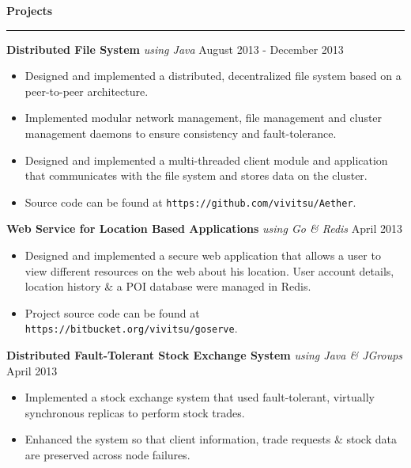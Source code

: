 \documentclass[10pt]{article}
\begin{document}
\textbf{Projects}
\smallskip
\hrule
\textbf{Distributed File System} \textit{using Java} \hfill August 2013 - December 2013
\begin{itemize}
    \item Designed and implemented a distributed, decentralized file system based on a peer-to-peer architecture.
    \item Implemented modular network management, file management and cluster management daemons to ensure consistency and fault-tolerance.
    \item Designed and implemented a multi-threaded client module and application that communicates with the file system and stores data on the cluster.
    \item Source code can be found at \texttt{https://github.com/vivitsu/Aether}.
\end{itemize}
\textbf{Web Service for Location Based Applications} \textit{using Go \& Redis} \hfill April 2013
\begin{itemize}
    \item Designed and implemented a secure web application that allows a user to view different resources on the web about his location. User account details, location history \& a POI database were managed in Redis.
    \item Project source code can be found at \texttt{https://bitbucket.org/vivitsu/goserve}.
\end{itemize}

\textbf{Distributed Fault-Tolerant Stock Exchange System} \textit{using Java \& JGroups} \hfill April 2013
\begin{itemize}
    \item Implemented a stock exchange system that used fault-tolerant, virtually synchronous replicas to perform stock trades.
    \item Enhanced the system so that client information, trade requests \& stock data are preserved across node failures. %
\end{itemize}
\end{document}
